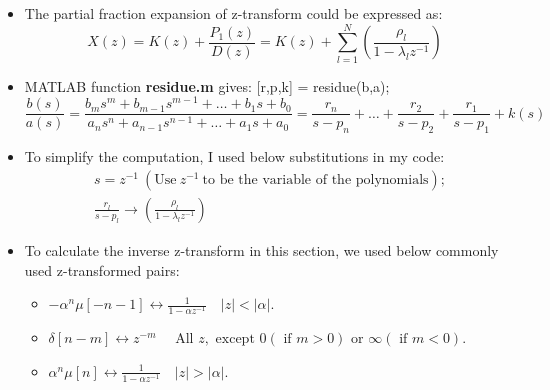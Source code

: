 \documentclass[onecolumn,oneside]{SUSTechHomework}
\begin{document}
\begin{info}
\begin{itemize}
    \item The partial fraction expansion of z-transform could be expressed as:
    $$
    X(z)=K(z)+\frac{P_{1}(z)}{D(z)}=K(z)+\sum_{l=1}^{N}\left(\frac{\rho_{l}}{1-\lambda_{l} z^{-1}}\right)
    $$
    \item MATLAB function \textbf{residue.m} gives: [r,p,k] = residue(b,a);    
        $$
        \frac{b(s)}{a(s)}=\frac{b_{m} s^{m}+b_{m-1} s^{m-1}+\ldots+b_{1} s+b_{0}}{a_{n} s^{n}+a_{n-1} s^{n-1}+\ldots+a_{1} s+a_{0}}=\frac{r_{n}}{s-p_{n}}+\ldots+\frac{r_{2}}{s-p_{2}}+\frac{r_{1}}{s-p_{1}}+k(s)
        $$
    \item To simplify the computation, I used below substitutions in my code:
    $$
    \begin{aligned}
        &s = z^{-1}\ (\text{Use}\ z^{-1}\ \text{to be the variable of the polynomials});\\
        &\frac{r_{l}}{s-p_{l}} \rightarrow \left(\frac{\rho_{l}}{1-\lambda_{l} z^{-1}}\right) 
    \end{aligned}
    $$
    \item To calculate the inverse z-transform in this section, we used below commonly used z-transformed pairs:
    \begin{itemize}
        \item $-\alpha^{n}\mu[-n-1] \leftrightarrow \frac{1}{1-\alpha z^{-1}} \quad|z|<|\alpha|$.
        \item $\delta[n-m]\leftrightarrow z^{-m} \quad \text { All } z, \text { except } 0(\text { if } m>0) \text { or } \infty(\text { if } m<0)$.
        \item $\alpha^{n} \mu[n] \leftrightarrow \frac{1}{1-\alpha z^{-1}} \quad|z|>|\alpha|$. 
    \end{itemize}
\end{itemize}
\end{info}
\end{document}
